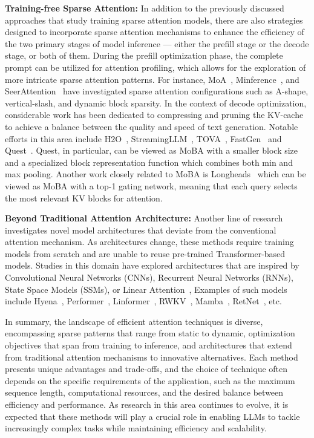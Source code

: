 \textbf{Training-free Sparse Attention:}
In addition to the previously discussed approaches that study training sparse attention models, there are also strategies designed to incorporate sparse attention mechanisms to enhance the efficiency of the two primary stages of model inference --- either the prefill stage or the decode stage, or both of them.
%
During the prefill optimization phase, the complete prompt can be utilized for attention profiling, which allows for the exploration of more intricate sparse attention patterns. For instance, MoA~\citep{fu2024moa}, Minference~\citep{jiang2024minference}, and SeerAttention~\citep{gao2024seerattention} have investigated sparse attention configurations such as A-shape, vertical-slash, and dynamic block sparsity.
%
In the context of decode optimization, considerable work has been dedicated to compressing and pruning the KV-cache to achieve a balance between the quality and speed of text generation. Notable efforts in this area include H2O~\citep{zhang2024h2o}, StreamingLLM~\citep{xiao2023efficient}, TOVA~\citep{oren2024tova}, FastGen~\citep{ge2023fastgen} and  Quest~\citep{tang2024quest}. Quest, in particular, can be viewed as MoBA with a smaller block size and a specialized block representation function which combines both min and max pooling. Another work closely related to MoBA is Longheads~\citep{lu2024longheads} which can be viewed as MoBA with a top-1 gating network, meaning that each query selects the most relevant KV blocks for attention.


\textbf{Beyond Traditional Attention Architecture:} Another line of research  investigates novel model architectures that deviate from the conventional attention mechanism. As architectures change, these methods require training models from scratch and are unable to reuse pre-trained Transformer-based models. 
 Studies in this domain have explored architectures that are inspired by  Convolutional Neural Networks (CNNs), Recurrent Neural Networks (RNNs), State Space Models (SSMs), or Linear Attention~\citep{katharopoulos2020transformers}, Examples of such models include Hyena~\citep{poli2023hyena},  Performer~\citep{choromanski2020rethinking},
Linformer~\citep{wang2020linformer},
RWKV~\cite{peng2023rwkv}, Mamba~\citep{gu2023mamba}, RetNet~\citep{sun2023retentive}, etc.

In summary, the landscape of efficient attention techniques is diverse, encompassing sparse patterns that range from static to dynamic, optimization objectives that span from training to inference, and architectures that extend from traditional attention mechanisms to innovative alternatives.
%
Each method presents unique advantages and trade-offs, and the choice of technique often depends on the specific requirements of the application, such as the maximum sequence length, computational resources, and the desired balance between efficiency and performance. As research in this area continues to evolve, it is expected that these methods will play a crucial role in enabling LLMs to tackle increasingly complex tasks while maintaining efficiency and scalability.